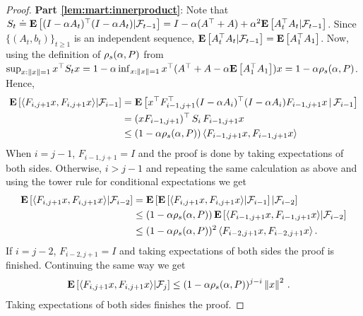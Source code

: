 \begin{proof}
\noindent \textbf{Part \ref{lem:mart:innerproduct}}:
Note that
$S_t\doteq \mathbf{E}\left[ (I-\alpha A_t)^\top (I-\alpha A_t) | \mathcal{F}_{t-1} \right]
= I - \alpha (A^\top + A) + \alpha^2 \mathbf{E}\left[ A_t^\top A_t | \mathcal{F}_{t-1} \right]$.
Since $\{(A_t,b_t)\}_{t\ge 1}$ is an independent sequence, $\mathbf{E}\left[ A_t^\top A_t|\mathcal{F}_{t-1}\right] = \mathbf{E}\left[ A_1^\top A_1 \right]$.
Now, using the definition of $\rho_s(\alpha,P)$ from 
$\sup_{x:\left\| x\right\|= 1} x^\top S_t x = 1 - \alpha \inf_{x:\left\| x\right\|=1} x^\top (A^\top + A - \alpha \mathbf{E}\left[A_1^\top A_1\right]) x
= 1-\alpha \rho_s(\alpha,P)$.
Hence,
\begin{align*}
\mathbf{E}\left[\langle F_{i,j+1}x,F_{i,j+1}x\rangle|\mathcal{F}_{i-1} \right]
&= \mathbf{E}\left[x^\top F_{i-1,j+1}^\top (I-\alpha A_i)^\top (I-\alpha A_i) F_{i-1,j+1} x\,|\,\mathcal{F}_{i-1}\right]\\
&=(x F_{i-1,j+1})^\top \, S_i \, F_{i-1,j+1} x\\
&\le (1-\alpha \rho_s(\alpha,P)) \, \langle F_{i-1,j+1} x, F_{i-1,j+1} x\rangle
\end{align*}
When $i=j-1$, $F_{i-1,j+1}=I$ and the proof is done by taking expectations of both sides.
Otherwise, $i>j-1$ and repeating the same calculation as above
and using the tower rule for conditional expectations we get
\begin{align*}
\mathbf{E}\left[\langle F_{i,j+1}x,F_{i,j+1}x\rangle|\mathcal{F}_{i-2}\right]
&=
\mathbf{E}\left[\mathbf{E}\left[\langle F_{i,j+1}x,F_{i,j+1}x\rangle|\mathcal{F}_{i-1} \right]|\mathcal{F}_{i-2}\right]\\
& \le (1-\alpha \rho_s(\alpha,P)) \, \mathbf{E}\left[\langle F_{i-1,j+1} x, F_{i-1,j+1} x\rangle|\mathcal{F}_{i-2}\right] \\
& \le (1-\alpha \rho_s(\alpha,P))^2\, \langle F_{i-2,j+1} x, F_{i-2,j+1} x\rangle\,.
\end{align*}
If $i=j-2$, $F_{i-2,j+1}=I$ and taking expectations of both sides the proof is finished.
Continuing the same way we get
\begin{align*}
\mathbf{E}\left[\langle F_{i,j+1}x,F_{i,j+1}x\rangle|\mathcal{F}_{j}\right]
& \le (1-\alpha \rho_s(\alpha,P))^{j-i} \left\| x\right\|^2\,.
\end{align*}
Taking expectations of both sides finishes the proof.
\end{proof}

